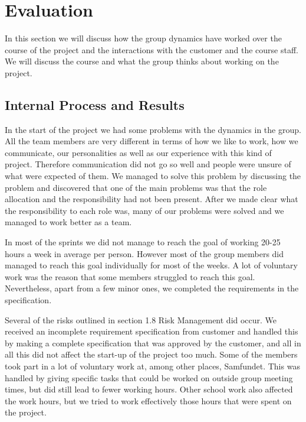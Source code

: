 \section{Evaluation}

In this section we will discuss how the group dynamics have worked over the
course of the project and the interactions with the customer and the course
staff. We will discuss the course and what the group thinks about working on the
project.

\subsection{Internal Process and Results}


	In the start of the project we had some problems with the dynamics in the group. 
	All the team members are very different in terms of how we like to work, how we communicate, 
	our personalities as well as our experience with this kind of project. Therefore communication 
	did not go so well and people were unsure of what were expected of them. We managed to solve 
	this problem by discussing the problem and discovered that one of the main problems was that 
	the role allocation and the responsibility had not been present. After we made clear what the 
	responsibility to each role was, many of our problems were solved and we managed to work better 
	as a team.

	In most of the sprints we did not manage to reach the goal of working 20-25 hours a week in 
	average per person. However most of the group members did managed to reach this goal individually 
	for most of the weeks. A lot of voluntary work was the reason that some members struggled to reach 
	this goal. Nevertheless, apart from a few minor ones, we completed the requirements in the specification.

	Several of the risks outlined in section 1.8 Risk Management did occur. We received an incomplete 
	requirement specification from customer and handled this by making a complete specification that 
	was approved by the customer, and all in all this did not affect the start-up of the project too much. 
	Some of the members took part in a lot of voluntary work at, among other places, Samfundet. This was handled 
	by giving specific tasks that could be worked on outside group meeting times, but did still lead to fewer 
	working hours. Other school work also affected the work hours, but we tried to work effectively those hours 
	that were spent on the project.

